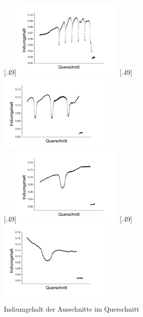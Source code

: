 \documentclass[a4paper,11pt,DIV=11]{scrartcl}
\begin{document}
\begin{figure}[htb]\centering
	[.49\linewidth]{\includegraphics[width=0.49\textwidth]{Versuchsdaten/11/34000xausschnitt.png}}
	[.49\linewidth]{\includegraphics[width=0.49\textwidth]{Versuchsdaten/11/87000xausschnitt.png}}\\
	[.49\linewidth]{\includegraphics[width=0.49\textwidth]{Versuchsdaten/11/185000xausschnitt.png}}
	[.49\linewidth]{\includegraphics[width=0.49\textwidth]{Versuchsdaten/11/380000xausschnitt.png}}
	\caption{Indiumgehalt der Ausschnitte im Querschnitt} \label{indprofil}
\end{figure}
\end{document}

